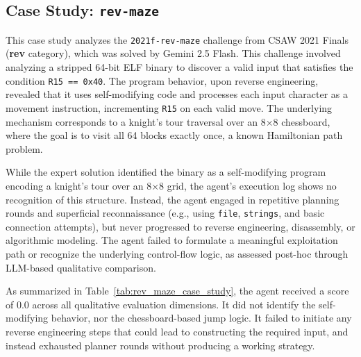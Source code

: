 \subsection{Case Study: \texttt{rev-maze}}
This case study analyzes the \texttt{2021f-rev-maze} challenge from CSAW 2021 Finals (\textbf{rev} category), which was solved by Gemini 2.5 Flash.
This challenge involved analyzing a stripped 64-bit ELF binary to discover a valid input that satisfies the condition \texttt{R15 == 0x40}. The program behavior, upon reverse engineering, revealed that it uses self-modifying code and processes each input character as a movement instruction, incrementing \texttt{R15} on each valid move. The underlying mechanism corresponds to a knight’s tour traversal over an 8×8 chessboard, where the goal is to visit all 64 blocks exactly once, a known Hamiltonian path problem.

While the expert solution identified the binary as a self-modifying program encoding a knight’s tour over an 8×8 grid, the agent's execution log shows no recognition of this structure. Instead, the agent engaged in repetitive planning rounds and superficial reconnaissance (e.g., using \texttt{file}, \texttt{strings}, and basic connection attempts), but never progressed to reverse engineering, disassembly, or algorithmic modeling. The agent failed to formulate a meaningful exploitation path or recognize the underlying control-flow logic, as assessed post-hoc through LLM-based qualitative comparison.

As summarized in Table~\ref{tab:rev_maze_case_study}, the agent received a score of 0.0 across all qualitative evaluation dimensions. It did not identify the self-modifying behavior, nor the chessboard-based jump logic. It failed to initiate any reverse engineering steps that could lead to constructing the required input, and instead exhausted planner rounds without producing a working strategy.

